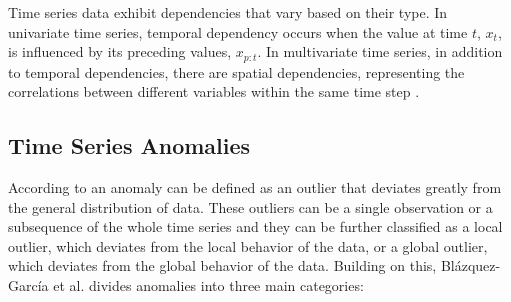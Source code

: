 Time series data exhibit dependencies that vary based on their type. In univariate time series, temporal dependency occurs when the value at time $t$, $x_t$, is influenced by its preceding values, $x_{p:t}$. In multivariate time series, in addition to temporal dependencies, there are spatial dependencies, representing the correlations between different variables within the same time step \cite{Zamanzadeh_Darban_Webb_Pan_Aggarwal_Salehi_2024}.

\subsection{Time Series Anomalies}

According to \cite{Grubbs_1969} an anomaly can be defined as an outlier that deviates greatly from the general distribution of data. These outliers can be a single observation or a subsequence of the whole time series and they can be further classified as a local outlier, which deviates from the local behavior of the data, or a global outlier, which deviates from the global behavior of the data. Building on this, Blázquez-García et al. \cite{Blazquez-Garcia_Conde_Mori_Lozano_2021} divides anomalies into three main categories:

